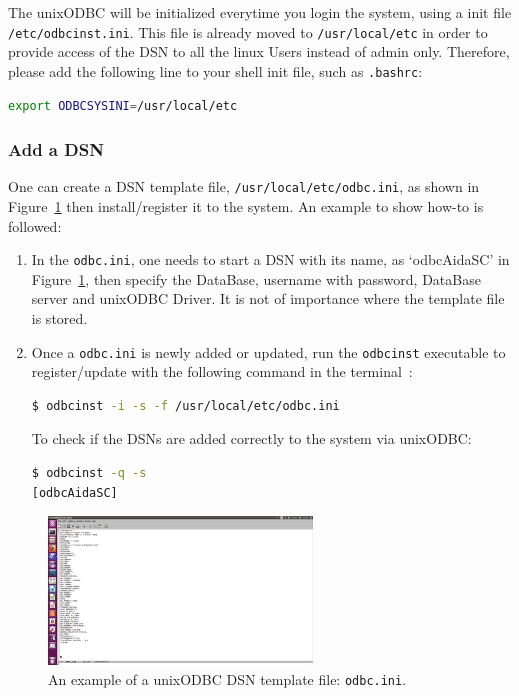 \documentclass[a4paper,12pt]{scrartcl}
\begin{document}
The unixODBC will be initialized everytime you login the system, using a init file \verb|/etc/odbcinst.ini|.
This file is already moved to \verb|/usr/local/etc| in order to provide access of the DSN to all the linux Users instead of admin only.
Therefore, please add the following line to your shell init file, such as \verb|.bashrc|:
\begin{lstlisting}[language=bash]
export ODBCSYSINI=/usr/local/etc
\end{lstlisting}

\subsubsection*{Add a DSN}
One can create a DSN template file, \verb|/usr/local/etc/odbc.ini|, as shown in Figure~\ref{fig:unixODBC} then install/register it to the system. An example to show how-to is followed:
\begin{enumerate}[label=(\roman*)]
  \item In the \verb|odbc.ini|, one needs to start a DSN with its name, as `odbcAidaSC' in Figure~\ref{fig:unixODBC}, then specify the DataBase, username with password, DataBase   server and unixODBC Driver. It is not of importance where the template file is stored.
  \item Once a \verb|odbc.ini| is newly added or updated, run the \verb|odbcinst| executable to register/update with the following command in the terminal~\cite{unixodbc-howto}:%
  \begin{lstlisting}[language=bash]
$ odbcinst -i -s -f /usr/local/etc/odbc.ini\end{lstlisting}
  To check if the DSNs are added correctly to the system via unixODBC:
  \begin{lstlisting}[language=bash]
$ odbcinst -q -s
[odbcAidaSC]\end{lstlisting}
\end{enumerate}

\begin{figure}[!ht]
\centering
\includegraphics[trim={2.5cm 5cm 50cm 3.5cm},clip,width=7cm]{figs/unixtemplate.png}
\caption{An example of a unixODBC DSN template file: \texttt{odbc.ini}.}
\label{fig:unixODBC}
\end{figure}
\end{document}
